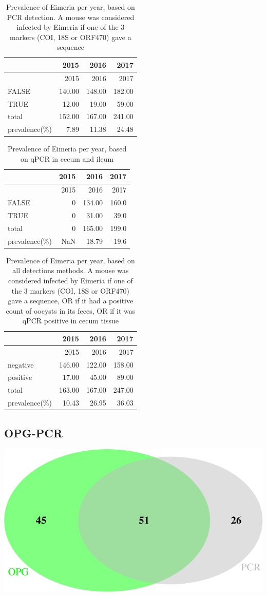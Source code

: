 \documentclass[]{article}
\begin{document}
\begin{longtable}[]{@{}lrrr@{}}
\caption{Prevalence of Eimeria per year, based on PCR detection. A mouse
was considered infected by Eimeria if one of the 3 markers (COI, 18S or
ORF470) gave a sequence}\tabularnewline
\toprule
& 2015 & 2016 & 2017\tabularnewline
\midrule
\endfirsthead
\toprule
& 2015 & 2016 & 2017\tabularnewline
\midrule
\endhead
FALSE & 140.00 & 148.00 & 182.00\tabularnewline
TRUE & 12.00 & 19.00 & 59.00\tabularnewline
total & 152.00 & 167.00 & 241.00\tabularnewline
prevalence(\%) & 7.89 & 11.38 & 24.48\tabularnewline
\bottomrule
\end{longtable}

\begin{longtable}[]{@{}lrrr@{}}
\caption{Prevalence of Eimeria per year, based on qPCR in cecum and
ileum}\tabularnewline
\toprule
& 2015 & 2016 & 2017\tabularnewline
\midrule
\endfirsthead
\toprule
& 2015 & 2016 & 2017\tabularnewline
\midrule
\endhead
FALSE & 0 & 134.00 & 160.0\tabularnewline
TRUE & 0 & 31.00 & 39.0\tabularnewline
total & 0 & 165.00 & 199.0\tabularnewline
prevalence(\%) & NaN & 18.79 & 19.6\tabularnewline
\bottomrule
\end{longtable}

\begin{longtable}[]{@{}lrrr@{}}
\caption{Prevalence of Eimeria per year, based on all detections
methods. A mouse was considered infected by Eimeria if one of the 3
markers (COI, 18S or ORF470) gave a sequence, OR if it had a positive
count of oocysts in its feces, OR if it was qPCR positive in cecum
tissue}\tabularnewline
\toprule
& 2015 & 2016 & 2017\tabularnewline
\midrule
\endfirsthead
\toprule
& 2015 & 2016 & 2017\tabularnewline
\midrule
\endhead
negative & 146.00 & 122.00 & 158.00\tabularnewline
positive & 17.00 & 45.00 & 89.00\tabularnewline
total & 163.00 & 167.00 & 247.00\tabularnewline
prevalence(\%) & 10.43 & 26.95 & 36.03\tabularnewline
\bottomrule
\end{longtable}

\subsection{OPG-PCR}\label{opg-pcr}

\includegraphics{Data_Analysis_Alice_files/figure-latex/opgpcr-1.pdf}
\end{document}
